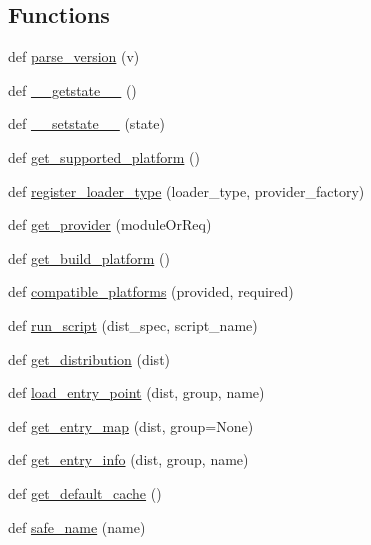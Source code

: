 \subsection*{Functions}
\begin{DoxyCompactItemize}
\item 
def \hyperlink{namespacepkg__resources_acedac33b376a00a24ba64609617054d8}{parse\+\_\+version} (v)
\item 
def \hyperlink{namespacepkg__resources_a8bf54875ad4040265a3eac20e4eca14f}{\+\_\+\+\_\+getstate\+\_\+\+\_\+} ()
\item 
def \hyperlink{namespacepkg__resources_ae71bb9a1aa190cf1f23a4474ea1e638b}{\+\_\+\+\_\+setstate\+\_\+\+\_\+} (state)
\item 
def \hyperlink{namespacepkg__resources_a2ad1c6a7e428d89c722264e41cc9214e}{get\+\_\+supported\+\_\+platform} ()
\item 
def \hyperlink{namespacepkg__resources_aebea9035d439bfb9fd4ec75e1c2d2003}{register\+\_\+loader\+\_\+type} (loader\+\_\+type, provider\+\_\+factory)
\item 
def \hyperlink{namespacepkg__resources_ae7d5476e7cb36e118cf324cda5f2ace5}{get\+\_\+provider} (module\+Or\+Req)
\item 
def \hyperlink{namespacepkg__resources_a428a5468ed29d9fc3a2c9c7b3c69d4d8}{get\+\_\+build\+\_\+platform} ()
\item 
def \hyperlink{namespacepkg__resources_aa77948d4629271731ceb9154c30c65cd}{compatible\+\_\+platforms} (provided, required)
\item 
def \hyperlink{namespacepkg__resources_a37b3befc5c87a30dc05883907e765d4d}{run\+\_\+script} (dist\+\_\+spec, script\+\_\+name)
\item 
def \hyperlink{namespacepkg__resources_a2855f6a8b340925bb37a05cca44c6858}{get\+\_\+distribution} (dist)
\item 
def \hyperlink{namespacepkg__resources_a2bc38c681dc970a15ff89f47bedd624a}{load\+\_\+entry\+\_\+point} (dist, group, name)
\item 
def \hyperlink{namespacepkg__resources_ad16e5d5879cbf9b5302b755ae1d0e5c2}{get\+\_\+entry\+\_\+map} (dist, group=None)
\item 
def \hyperlink{namespacepkg__resources_afbe243e1bf56cc04e07807c30e8b8145}{get\+\_\+entry\+\_\+info} (dist, group, name)
\item 
def \hyperlink{namespacepkg__resources_a605d91f78bde46cd2f7db04c78b9c28c}{get\+\_\+default\+\_\+cache} ()
\item 
def \hyperlink{namespacepkg__resources_a9635d106e0984b74bbcd80646e7a7384}{safe\+\_\+name} (name)

\end{DoxyCompactItemize}
